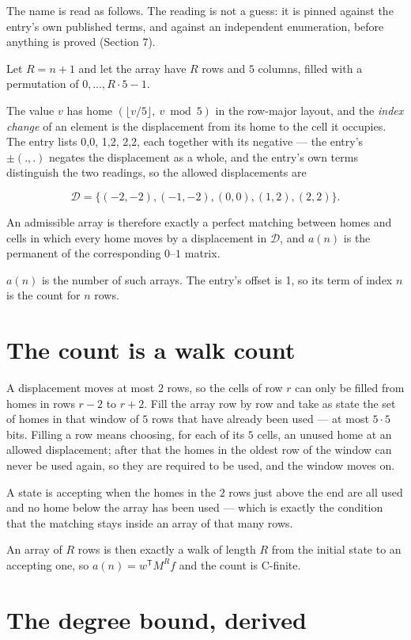\documentclass[11pt]{article}
\theoremstyle{definition}
\begin{document}
The name is read as follows. The reading is not a guess: it is pinned against the entry's own published terms, and against an independent enumeration, before anything is proved (Section 7).

Let $R = n + 1$ and let the array have $R$ rows and $5$ columns, filled with a permutation of $0,\dots,R\cdot5-1$.

The value $v$ has home $(\lfloor v/5\rfloor,\ v \bmod 5)$ in the row-major layout, and the {\itshape index change} of an element is the displacement from its home to the cell it occupies. The entry lists 0,0, 1,2, 2,2, each together with its negative --- the entry's $\pm(.,.)$ negates the displacement as a whole, and the entry's own terms distinguish the two readings, so the allowed displacements are

\[\mathcal{D} = \{(-2,-2), (-1,-2), (0,0), (1,2), (2,2)\}.\]

An admissible array is therefore exactly a perfect matching between homes and cells in which every home moves by a displacement in $\mathcal{D}$, and $a(n)$ is the permanent of the corresponding $0$--$1$ matrix.

$a(n)$ is the number of such arrays. The entry's offset is 1, so its term of index $n$ is the count for $n$ rows.

\section{The count is a walk count}

A displacement moves at most $2$ rows, so the cells of row $r$ can only be filled from homes in rows $r-2$ to $r+2$. Fill the array row by row and take as state the set of homes in that window of $5$ rows that have already been used --- at most $5\cdot5$ bits. Filling a row means choosing, for each of its $5$ cells, an unused home at an allowed displacement; after that the homes in the oldest row of the window can never be used again, so they are required to be used, and the window moves on.

A state is accepting when the homes in the $2$ rows just above the end are all used and no home below the array has been used --- which is exactly the condition that the matching stays inside an array of that many rows.

An array of $R$ rows is then exactly a walk of length $R$ from the initial state to an accepting one, so $a(n) = w^{\mathsf T}M^{R}f$ and the count is C-finite.

\section{The degree bound, derived}
\end{document}
